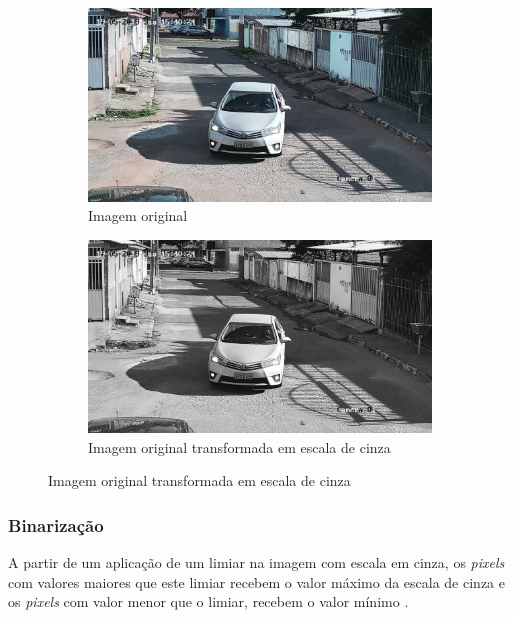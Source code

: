 \begin{figure}[H]
    \centering
     \begin{subfigure}{0.8\textwidth}
        \includegraphics[width=\textwidth]{figuras/transforma2.jpg}
        \caption{Imagem original}
          \label{original}
      \end{subfigure}
        \hfill
      \begin{subfigure}{0.8\textwidth}
        \includegraphics[width=\textwidth]{figuras/transforma2_1.jpg}
        \caption{Imagem original transformada em escala de cinza}
          \label{cinza}
      \end{subfigure}
        \hfill
       
\end{figure} 


\subsubsection{Binarização}
A partir de um aplicação de um limiar na imagem com escala em cinza, os \emph{pixels} com valores maiores que este limiar recebem o valor máximo da escala de cinza e os \emph{pixels} com valor menor que o limiar, recebem o valor mínimo  \cite{gonzalez2007digital}.

